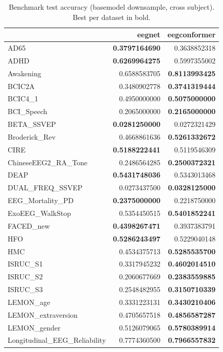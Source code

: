 \begin{table}[htbp]
\caption{Benchmark test accuracy (basemodel downsample, cross subject). Best per dataset in bold.}
\label{tab:benchmark_results_basemodel_downsample_cross_subject}
\begin{tabular}{lrr}
\toprule
 & eegnet & eegconformer \\
\midrule
AD65 & \bfseries 0.3797164690 & 0.3638852318 \\
ADHD & \bfseries 0.6269964275 & 0.5997355002 \\
Awakening & 0.6588583705 & \bfseries 0.8113993425 \\
BCIC2A & 0.3480902778 & \bfseries 0.3741319444 \\
BCIC4_1 & 0.4950000000 & \bfseries 0.5075000000 \\
BCI_Speech & 0.2065000000 & \bfseries 0.2165000000 \\
BETA_SSVEP & \bfseries 0.0281250000 & 0.0272321429 \\
Broderick_Rev & 0.4668861636 & \bfseries 0.5261332672 \\
CIRE & \bfseries 0.5188222441 & 0.5119546309 \\
ChineseEEG2_RA_Tone & 0.2486564285 & \bfseries 0.2500372321 \\
DEAP & \bfseries 0.5431748036 & 0.5343013468 \\
DUAL_FREQ_SSVEP & 0.0273437500 & \bfseries 0.0328125000 \\
EEG_Mortality_PD & \bfseries 0.2375000000 & 0.2218750000 \\
ExoEEG_WalkStop & 0.5354450515 & \bfseries 0.5401852241 \\
FACED_new & \bfseries 0.4398267471 & 0.3937383791 \\
HFO & \bfseries 0.5286243497 & 0.5229040148 \\
HMC & 0.4534375713 & \bfseries 0.5285535700 \\
ISRUC_S1 & 0.3317945232 & \bfseries 0.4602014510 \\
ISRUC_S2 & 0.2060677669 & \bfseries 0.2383559885 \\
ISRUC_S3 & 0.2548482955 & \bfseries 0.3150710339 \\
LEMON_age & 0.3331223131 & \bfseries 0.3430210406 \\
LEMON_extraversion & 0.4705657518 & \bfseries 0.4856587287 \\
LEMON_gender & 0.5126079065 & \bfseries 0.5780389914 \\
Longitudinal_EEG_Reliability & 0.7774360500 & \bfseries 0.7966557832 \\

\end{tabular}
\end{table}
